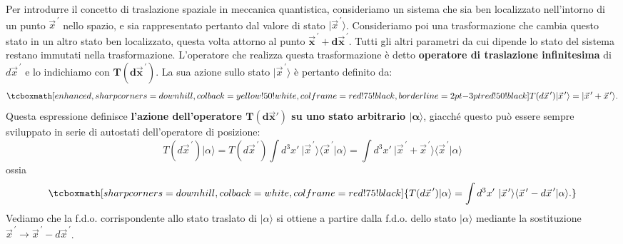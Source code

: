 \documentclass[a4paper,12pt,oneside]{book}
\begin{document}
Per introdurre il concetto di traslazione spaziale in meccanica quantistica, consideriamo un sistema che sia ben localizzato nell'intorno di un punto ${\vec{x}}^{\, \prime}$ nello spazio, e sia rappresentato pertanto dal valore di stato $\vert {\vec{x}}^{\, \prime} \rangle$. Consideriamo poi una trasformazione che cambia questo stato in un altro stato ben localizzato, questa volta attorno al punto $\mathbf{{\vec{x}}^{\, \prime} + d{\vec{x}}^{\, \prime}}$. Tutti gli altri parametri da cui dipende lo stato del sistema restano immutati nella trasformazione. L'operatore che realizza questa trasformazione è detto \textbf{operatore di traslazione infinitesima} di $d{\vec{x}}^{\, \prime}$ e lo indichiamo con $\mathbf{T(d{\vec{x}}^{\, \prime})}$. La sua azione sullo stato
 $\vert {\vec{x}}^{\, \prime} \rangle$ è pertanto definito da:
	\begin{equation}
		\tcboxmath[enhanced,sharp corners=downhill ,colback=yellow!50!white,colframe=red!75!black, borderline={2pt}{-3pt}{red!50!black}]{	
			T(d{\vec{x}}^{\, \prime})\vert {\vec{x}}^{\, \prime} \rangle=\vert {\vec{x}}^{\, \prime}+ {\vec{x}}^{\, \prime} \rangle .
			}
	\end{equation}
Questa espressione definisce \textbf{l'azione dell'operatore $\mathbf{T(d\vec{x}')}$ su uno stato arbitrario $\mathbf{\vert \alpha \rangle}$}, giacché questo può essere sempre sviluppato in serie di autostati dell'operatore di posizione:
	\begin{equation}
		T({d\vec{x}}^{\, \prime}) \vert \alpha \rangle = T(d{\vec{x}}^{\, \prime}) \int d^3x' \ \vert {\vec{x}}^{\, \prime} \rangle \langle {\vec{x}}^{\, \prime} \vert \alpha \rangle =   \int d^3x' \ {\vert \vec{x}}^{\, \prime} + {\vec{x}}^{\, \prime} \rangle \langle {\vec{x}}^{\, \prime} \vert \alpha \rangle 
	\end{equation}
ossia
	\begin{equation}
		\tcboxmath[sharp corners=downhill ,colback=white,colframe=red!75!black]{
			T({d\vec{x}}^{\, \prime}) \vert \alpha \rangle  = \int d^3x' \ \vert {\vec{x}}^{\, \prime}  \rangle \langle {\vec{x}}^{\, \prime} - {d\vec{x}}^{\, \prime} \vert \alpha \rangle .
			}
	\end{equation}
Vediamo che la f.d.o. corrispondente allo stato traslato di $\vert \alpha \rangle $ si ottiene a partire dalla f.d.o. dello stato $\vert \alpha \rangle $ mediante la sostituzione ${\vec{x}}^{\, \prime} \rightarrow {\vec{x}}^{\, \prime}-d{\vec{x}}^{\, \prime}$.\\
\end{document}
